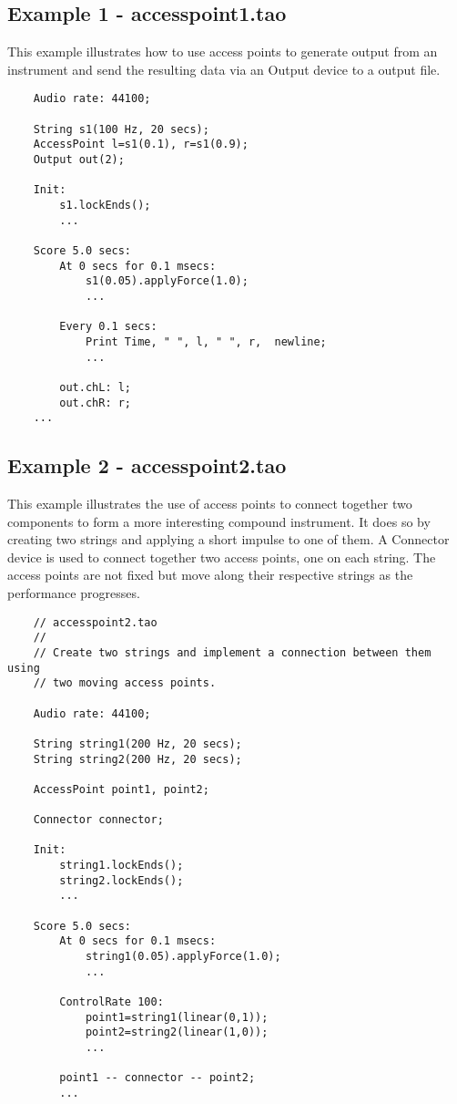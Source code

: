\subsection{Example 1 - accesspoint1.tao}
This example illustrates how to use access points
to generate output from an instrument and send the resulting data via an
Output device to a output file.

\begin{verbatim}
    Audio rate: 44100;
        
    String s1(100 Hz, 20 secs);    
    AccessPoint l=s1(0.1), r=s1(0.9);
    Output out(2);
        
    Init:
        s1.lockEnds();
        ...
        
    Score 5.0 secs:
        At 0 secs for 0.1 msecs:
            s1(0.05).applyForce(1.0);
            ...
        
        Every 0.1 secs:
            Print Time, " ", l, " ", r,  newline;
            ...
        
        out.chL: l;
        out.chR: r;
    ...    
\end{verbatim}

\subsection{Example 2 - accesspoint2.tao}
This example illustrates the use of access points
to connect together two components to form a more interesting compound
instrument. It does so by creating two strings and applying a short
impulse to one of them. A Connector device is used to connect together
two access points, one on each string. The access points are not fixed
but move along their respective strings as the performance progresses. 

\begin{verbatim}
    // accesspoint2.tao
    //
    // Create two strings and implement a connection between them using
    // two moving access points.
        
    Audio rate: 44100;
        
    String string1(200 Hz, 20 secs);
    String string2(200 Hz, 20 secs);
        
    AccessPoint point1, point2;
        
    Connector connector;
        
    Init:
        string1.lockEnds();
        string2.lockEnds();
        ...
        
    Score 5.0 secs:
        At 0 secs for 0.1 msecs:
            string1(0.05).applyForce(1.0);
            ...
        
        ControlRate 100:
            point1=string1(linear(0,1));
            point2=string2(linear(1,0));
            ...
            
        point1 -- connector -- point2;
        ...
\end{verbatim}

